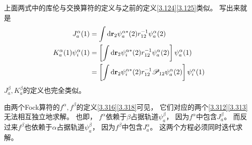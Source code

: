 上面两式中的库伦与交换算符的定义与之前的定义\autoref{3.124}\autoref{3.125}类似。
写出来就是
\begin{align}
	J_a^\alpha(1) & = \int \dd\bfr_2 \psi_a^{\alpha*}(2) \twoe \psi_a^\alpha(2) \label{3.319}\\
	K_a^\alpha(1)\psi_i^\alpha(1) 
	    &= \left[ \int \dd\bfr_2 \psi_i^{\alpha*}(2) \twoe \psi_a^\alpha(2)\right] \psi_a^\alpha(1) \notag\\
	    &= \left[ \int \dd\bfr_2 \psi_i^{\alpha*}(2) \twoe \mathscr{P}_{12}\psi_a^\alpha(2)\right] \psi_i^\alpha(1) \label{3.320}
\end{align}
$J_a^\beta,K_a^\beta$的定义也完全类似。

由两个Fock算符的$f^\alpha,f^\beta$的定义\autoref{3.316}\autoref{3.318}可见，
它们对应的两个\autoref{3.312}\autoref{3.313}无法相互独立地求解。
也即，
$f^\alpha$依赖于$\beta$占据轨道$\psi_a^\beta$，
因为$f^\alpha$中包含$J_a^\beta$。
而反过来$f^\beta$也依赖于$\alpha$占据轨道$\psi_a^\beta$，
因为$f^\beta$中包含$J_a^\alpha$。
这两个方程必须同时迭代求解。


